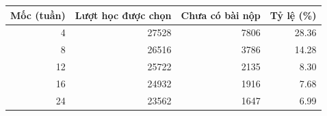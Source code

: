 \begin{tabular}{@{}rrrr@{}}
\toprule
\textbf{Mốc (tuần)} & \textbf{Lượt học được chọn} & \textbf{Chưa có bài nộp} & \textbf{Tỷ lệ (\%)} \\
\midrule
\num{4} & \num{27528} & \num{7806} & \num{28.36} \\
\num{8} & \num{26516} & \num{3786} & \num{14.28} \\
\num{12} & \num{25722} & \num{2135} & \num{8.30} \\
\num{16} & \num{24932} & \num{1916} & \num{7.68} \\
\num{24} & \num{23562} & \num{1647} & \num{6.99} \\
\bottomrule
\end{tabular}
